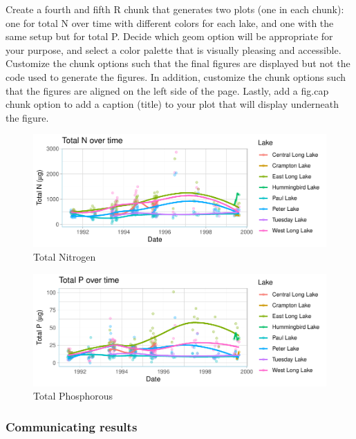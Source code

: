 \documentclass[
]{article}
\begin{document}
Create a fourth and fifth R chunk that generates two plots (one in each
chunk): one for total N over time with different colors for each lake,
and one with the same setup but for total P. Decide which geom option
will be appropriate for your purpose, and select a color palette that is
visually pleasing and accessible. Customize the chunk options such that
the final figures are displayed but not the code used to generate the
figures. In addition, customize the chunk options such that the figures
are aligned on the left side of the page. Lastly, add a fig.cap chunk
option to add a caption (title) to your plot that will display
underneath the figure.

\begin{figure}

\includegraphics{07_Part1_CraftingReports_Complete_files/figure-latex/plot.nitrogen-1} \hfill{}

\caption{Total Nitrogen}\label{fig:plot.nitrogen}
\end{figure}

\begin{figure}

\includegraphics{07_Part1_CraftingReports_Complete_files/figure-latex/plot.phosphorus-1} \hfill{}

\caption{Total Phosphorous}\label{fig:plot.phosphorus}
\end{figure}

\hypertarget{communicating-results}{%
\subsubsection{Communicating results}\label{communicating-results}}
\end{document}
